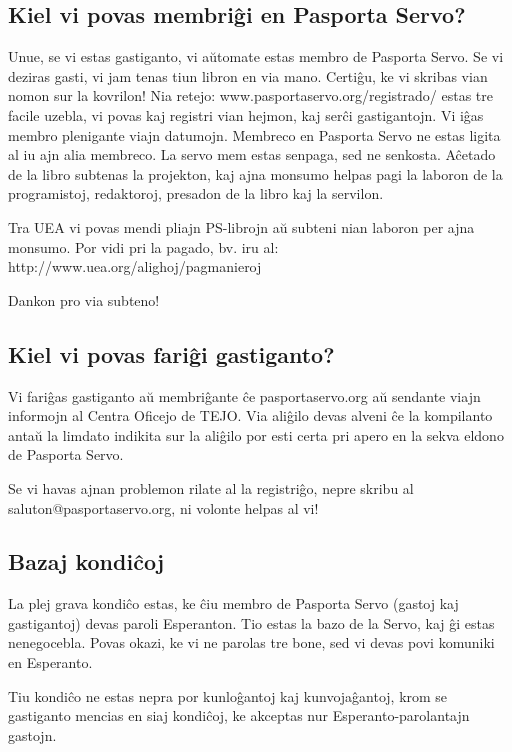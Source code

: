 {\subsection{Kiel vi povas membriĝi en Pasporta Servo?}

Unue, se vi estas gastiganto, vi aŭtomate estas membro de Pasporta Servo.
Se vi deziras gasti, vi jam tenas tiun libron en via mano. Certiĝu, ke vi skribas vian nomon sur la kovrilon!
Nia retejo: www.pasportaservo.org/registrado/ estas tre facile uzebla, vi povas kaj registri vian hejmon, kaj serĉi gastigantojn. Vi iĝas membro plenigante viajn datumojn.
Membreco en Pasporta Servo ne estas ligita al iu ajn alia membreco.
La servo mem estas senpaga, sed ne senkosta. Aĉetado de la libro subtenas la projekton, kaj ajna monsumo helpas pagi la laboron de la programistoj, redaktoroj, presadon de la libro kaj la servilon.

Tra UEA vi povas mendi pliajn PS-librojn aŭ subteni nian laboron per ajna monsumo.
Por vidi pri la pagado, bv. iru al:\\
http://www.uea.org/alighoj/pagmanieroj

Dankon pro via subteno!


\subsection{Kiel vi povas fariĝi gastiganto?}

Vi fariĝas gastiganto aŭ membriĝante ĉe pasportaservo.org aŭ sendante viajn informojn al Centra Oficejo de TEJO. Via aliĝilo devas alveni ĉe la kompilanto antaŭ la limdato indikita sur la aliĝilo por esti certa pri apero en la sekva eldono de Pasporta Servo.

Se vi havas ajnan problemon rilate al la registriĝo, nepre skribu al saluton@pasportaservo.org, ni volonte helpas al vi!

\subsection{Bazaj kondiĉoj}

La plej grava kondiĉo estas, ke ĉiu membro de Pasporta Servo (gastoj kaj gastigantoj) devas paroli Esperanton. Tio estas la bazo de la Servo, kaj ĝi estas nenegocebla. Povas okazi, ke vi ne parolas tre bone, sed vi devas povi komuniki en Esperanto.

Tiu kondiĉo ne estas nepra por kunloĝantoj kaj kunvojaĝantoj, krom se gastiganto mencias en siaj kondiĉoj, ke akceptas nur Esperanto-parolantajn gastojn.

}
